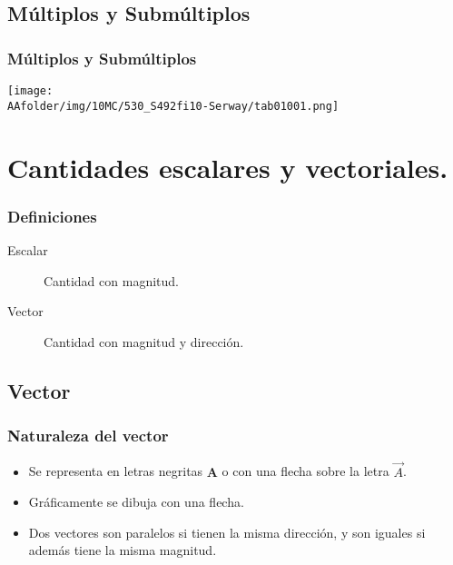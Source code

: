 \documentclass[
    aspectratio=169, %
    ]{beamer}
\newcommand{\AAfolder}{/home/luis/Documents/00-00AA-Apuntes}
\begin{document}
\subsection{Múltiplos y Submúltiplos}
\begin{frame}
    \frametitle{Múltiplos y Submúltiplos}\pause
    \begin{center}
        \texttt{[image: \\AAfolder/img/10MC/530\_S492fi10-Serway/tab01001.png]}
    \end{center}
\end{frame}
\section{Cantidades escalares y vectoriales.}
\begin{frame}
	\frametitle{Definiciones} \pause
    \begin{description}
        \item[Escalar] Cantidad con magnitud.\pause
        \item[Vector] Cantidad con magnitud y dirección.\pause
    \end{description}
\end{frame}
\subsection{Vector}
\begin{frame}
	\frametitle{Naturaleza del vector}\pause
    \begin{itemize}
        \item Se representa en letras negritas $\bm{A}$ o con una flecha sobre la letra $\vec{A}$.\pause
        \item Gráficamente se dibuja con una flecha.\pause \\
        \begin{center}
            
        \end{center}\pause
		\item Dos vectores son paralelos si tienen la misma dirección, y son iguales si además tiene la misma magnitud.\pause \\
    \end{itemize}
	\begin{center}
		
	\end{center}
\end{frame}
\end{document}
